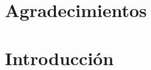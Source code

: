 \documentclass[a4paper,10pt]{book}
\theoremstyle{definition}
\begin{document}
\vfill
% 
% 
% 
% 


\chapter{Agradecimientos}

\chapter{Introducción}
\end{document}
